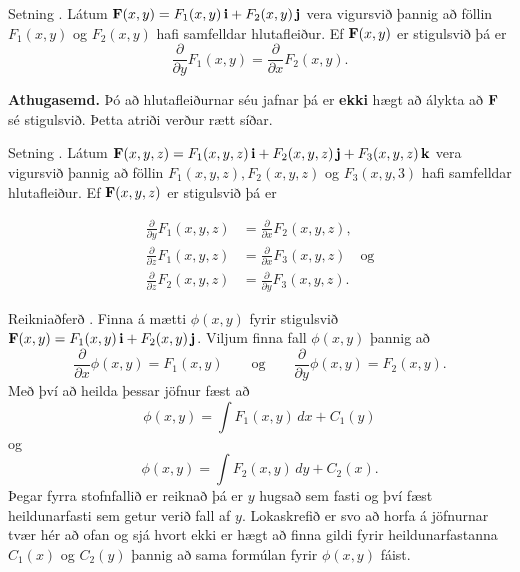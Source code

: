 \begin{frame}{} 

\begin {block}{Setning \kaflanr.}
 Látum $\mbox{${\bf F}$}(x,y)=F_1(x,y)\,\mbox{${\bf i}$}+F_2(x,y)\,\mbox{${\bf j}$}$ vera vigursvið þannig að föllin $F_1(x,y)$ og $F_2(x,y)$ hafi samfelldar hlutafleiður.  Ef $\mbox{${\bf F}$}(x,y)$ er stigulsvið þá er 
$$\frac{\partial}{\partial y}F_1(x,y)=
\frac{\partial}{\partial x}F_2(x,y).$$

\smallskip

{\bf Athugasemd.}  Þó að hlutafleiðurnar séu jafnar
þá er {\bf ekki} hægt að álykta að $\mbox{${\bf F}$}$ sé stigulsvið.  Þetta
atriði verður rætt síðar.
 
\end{block}

\end{frame}


\begin{frame}{} 

\begin {block}{Setning \kaflanr.}
Látum
$\mbox{${\bf F}$}(x,y,z)=F_1(x,y,z)\,\mbox{${\bf i}$}+F_2(x,y,z)\,\mbox{${\bf j}$}+F_3(x,y,z)\,\mbox{${\bf k}$}$ vera vigursvið
þannig að föllin $F_1(x,y,z), F_2(x,y,z)$ og $F_3(x,y,3)$ hafi
samfelldar hlutafleiður.  Ef $\mbox{${\bf F}$}(x,y,z)$ er stigulsvið þá er  

\begin {align*}
\frac{\partial}{\partial y}F_1(x,y,z) &=
\frac{\partial}{\partial x}F_2(x,y,z), \\
\frac{\partial}{\partial z}F_1(x,y,z) &=
\frac{\partial}{\partial x}F_3(x,y,z) \quad \text{og} \\
\frac{\partial}{\partial z}F_2(x,y,z)&=
\frac{\partial}{\partial y}F_3(x,y,z).
\end {align*}



\end{block}

\end{frame}


\begin{frame}{} 

\begin {block}{Reikniaðferð \kaflanr.}
 Finna á mætti $\phi(x,y)$ fyrir stigulsvið  $\mbox{${\bf F}$}(x,y)=F_1(x,y)\,\mbox{${\bf i}$}+F_2(x,y)\,\mbox{${\bf j}$}$.  Viljum finna fall $\phi(x,y)$ þannig að 
$$\frac{\partial}{\partial x}\phi(x,y)=F_1(x,y)\qquad
\mbox{og}\qquad \frac{\partial}{\partial y}\phi(x,y)=F_2(x,y).$$
 Með því að heilda þessar jöfnur fæst að 
 $$\phi(x,y)=\int F_1(x,y)\,dx+C_1(y)$$
og
$$\phi(x,y)=\int F_2(x,y)\,dy+C_2(x).$$
Þegar fyrra stofnfallið er reiknað þá er $y$ hugsað sem fasti og því fæst heildunarfasti sem getur verið fall af $y$.  Lokaskrefið er  svo að horfa á jöfnurnar tvær hér að ofan og sjá hvort ekki er hægt að finna gildi fyrir heildunarfastanna $C_1(x)$ og $C_2(y)$ þannig að sama formúlan fyrir $\phi(x,y)$ fáist.  
\end{block}

\end{frame}

